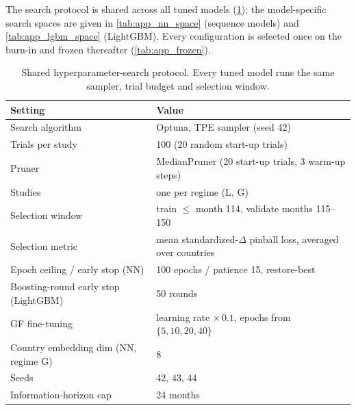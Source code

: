 The search protocol is shared across all tuned models (\cref{tab:app_protocol});
the model-specific search spaces are given in \cref{tab:app_nn_space}
(sequence models) and \cref{tab:app_lgbm_space} (LightGBM). Every configuration
is selected once on the burn-in and frozen thereafter (\cref{tab:app_frozen}).

\begin{table}[htbp]
  \centering\small
  \caption{Shared hyperparameter-search protocol. Every tuned model runs the same sampler, trial budget and selection window.}
  \label{tab:app_protocol}
  \begin{tabular}{@{}ll@{}}
    \toprule
    \textbf{Setting} & \textbf{Value} \\
    \midrule
    Search algorithm            & Optuna, TPE sampler (seed 42) \\
    Trials per study            & 100 (20 random start-up trials) \\
    Pruner                      & MedianPruner (20 start-up trials, 3 warm-up steps) \\
    Studies                     & one per regime (L, G) \\
    Selection window            & train $\le$ month 114, validate months 115--150 \\
    Selection metric            & mean standardized-$\Delta$ pinball loss, averaged over countries \\
    Epoch ceiling / early stop (NN) & 100 epochs / patience 15, restore-best \\
    Boosting-round early stop (LightGBM) & 50 rounds \\
    GF fine-tuning              & learning rate $\times\,0.1$, epochs from $\{5,10,20,40\}$ \\
    Country embedding dim (NN, regime G) & 8 \\
    Seeds                       & 42, 43, 44 \\
    Information-horizon cap     & 24 months \\
    \bottomrule
  \end{tabular}
\end{table}

